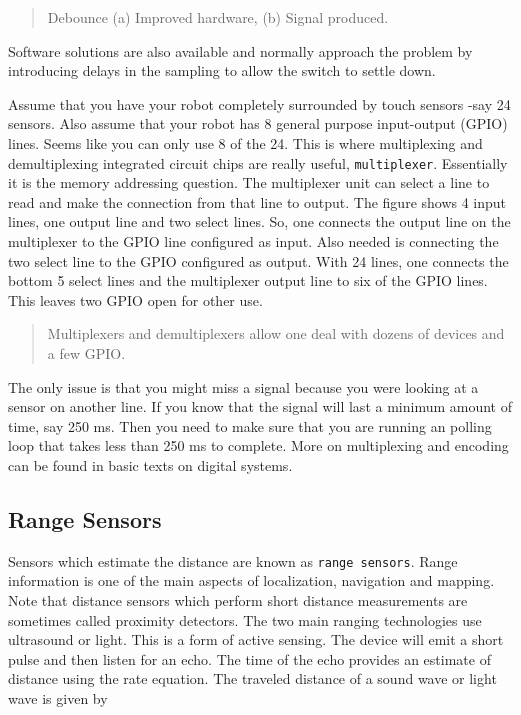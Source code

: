 \begin{quote}
Debounce (a) Improved hardware, (b) Signal produced.
\end{quote}

Software solutions are also available and normally approach the problem
by introducing delays in the sampling to allow the switch to settle
down.

Assume that you have your robot completely surrounded by touch sensors
-say 24 sensors. Also assume that your robot has 8 general purpose
input-output (GPIO) lines. Seems like you can only use 8 of the 24. This
is where multiplexing and demultiplexing integrated circuit chips are
really useful, \texttt{multiplexer}. Essentially it is the memory
addressing question. The multiplexer unit can select a line to read and
make the connection from that line to output. The figure shows 4 input
lines, one output line and two select lines. So, one connects the output
line on the multiplexer to the GPIO line configured as input. Also
needed is connecting the two select line to the GPIO configured as
output. With 24 lines, one connects the bottom 5 select lines and the
multiplexer output line to six of the GPIO lines. This leaves two GPIO
open for other use.

\begin{quote}
Multiplexers and demultiplexers allow one deal with dozens of devices
and a few GPIO.
\end{quote}

The only issue is that you might miss a signal because you were looking
at a sensor on another line. If you know that the signal will last a
minimum amount of time, say 250 ms. Then you need to make sure that you
are running an polling loop that takes less than 250 ms to complete.
More on multiplexing and encoding can be found in basic texts on digital
systems.

\hypertarget{range-sensors}{%
\subsection{Range Sensors}\label{range-sensors}}

Sensors which estimate the distance are known as
\texttt{range\ sensors}. Range information is one of the main aspects of
localization, navigation and mapping. Note that distance sensors which
perform short distance measurements are sometimes called proximity
detectors. The two main ranging technologies use ultrasound or light.
This is a form of active sensing. The device will emit a short pulse and
then listen for an echo. The time of the echo provides an estimate of
distance using the rate equation. The traveled distance of a sound wave
or light wave is given by

